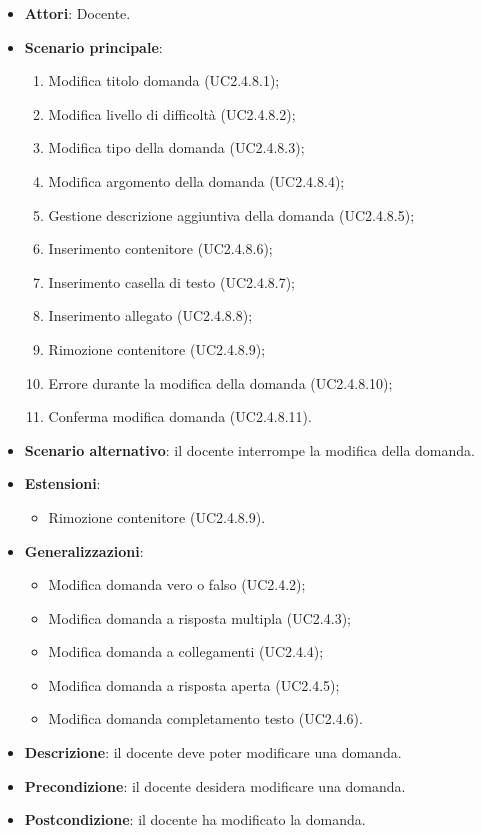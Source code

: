 \begin{itemize}
\item \textbf{Attori}: Docente.
\item \textbf{Scenario principale}:
\begin{enumerate}
\item Modifica titolo domanda (UC2.4.8.1);
\item Modifica livello di difficoltà  (UC2.4.8.2);
\item Modifica tipo della domanda (UC2.4.8.3);
\item Modifica argomento della domanda (UC2.4.8.4);
\item Gestione descrizione aggiuntiva della domanda (UC2.4.8.5);
\item Inserimento contenitore (UC2.4.8.6);
\item Inserimento casella di testo (UC2.4.8.7);
\item Inserimento allegato (UC2.4.8.8);
\item Rimozione contenitore (UC2.4.8.9);
\item Errore durante la modifica della domanda (UC2.4.8.10);
\item Conferma modifica domanda (UC2.4.8.11).
\end{enumerate}
\item \textbf{Scenario alternativo}: il docente interrompe la modifica della domanda.
\item \textbf{Estensioni}:
\begin{itemize}
\item Rimozione contenitore (UC2.4.8.9).
\end{itemize}
\item \textbf{Generalizzazioni}:
\begin{itemize}
\item Modifica domanda vero o falso (UC2.4.2);
\item Modifica domanda a risposta multipla (UC2.4.3);
\item Modifica domanda a collegamenti (UC2.4.4);
\item Modifica domanda a risposta aperta (UC2.4.5);
\item Modifica domanda completamento testo (UC2.4.6).
\end{itemize}
\item \textbf{Descrizione}: il docente deve poter modificare una domanda.
\item \textbf{Precondizione}: il docente desidera modificare una domanda.
\item \textbf{Postcondizione}: il docente ha modificato la domanda.
\end{itemize}
